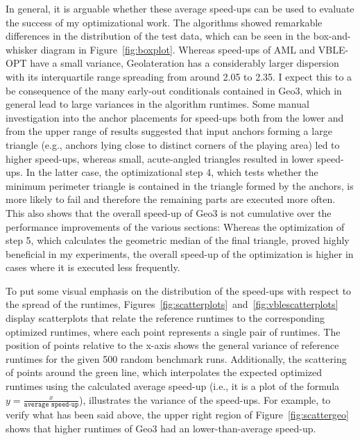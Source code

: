 In general, it is arguable whether these average speed-ups can be used to evaluate the success of my optimizational work. The algorithms showed remarkable differences in the distribution of the test data, which can be seen in the box-and-whisker diagram in Figure~\ref{fig:boxplot}. Whereas speed-ups of AML and VBLE-OPT have a small variance, Geolateration has a considerably larger dispersion with its interquartile range spreading from around 2.05 to 2.35. I expect this to a be consequence of the many early-out conditionals contained in Geo3, which in general lead to large variances in the algorithm runtimes. Some manual investigation into the anchor placements for speed-ups both from the lower and from the upper range of results suggested that input anchors forming a large triangle (e.g., anchors lying close to distinct corners of the playing area) led to higher speed-ups, whereas small, acute-angled triangles resulted in lower speed-ups. In the latter case, the optimizational step 4, which tests whether the minimum perimeter triangle is contained in the triangle formed by the anchors, is more likely to fail and therefore the remaining parts are executed more often. This also shows that the overall speed-up of Geo3 is not cumulative over the performance improvements of the various sections: Whereas the optimization of step 5, which calculates the geometric median of the final triangle, proved highly beneficial in my experiments, the overall speed-up of the optimization is higher in cases where it is executed less frequently.

To put some visual emphasis on the distribution of the speed-ups with respect to the spread of the runtimes, Figures~\ref{fig:scatterplots}~and~\ref{fig:vblescatterplots} display scatterplots that relate the reference runtimes to the corresponding optimized runtimes, where each point represents a single pair of runtimes. The position of points relative to the x-axis shows the general variance of reference runtimes for the given 500 random benchmark runs. Additionally, the scattering of points around the green line, which interpolates the expected optimized runtimes using the calculated average speed-up (i.e., it is a plot of the formula $y = \frac{x}{\texttt{average speed-up}}$), illustrates the variance of the speed-ups. For example, to verify what has been said above, the upper right region of Figure~\ref{fig:scattergeo} shows that higher runtimes of Geo3 had an lower-than-average speed-up.

